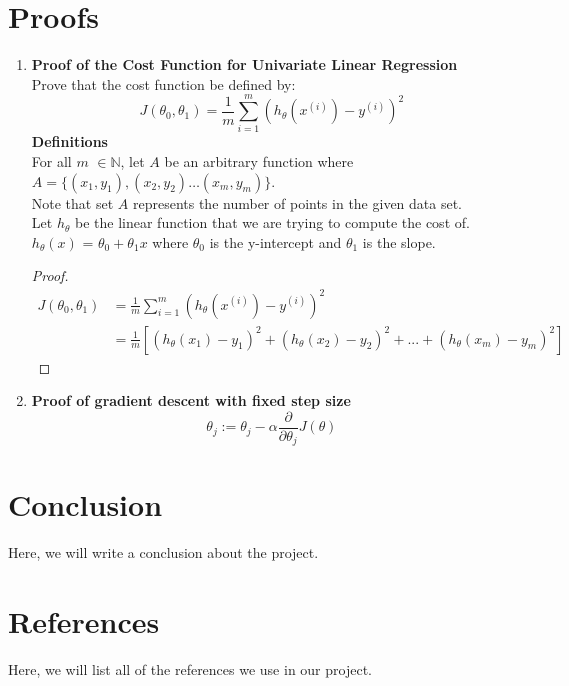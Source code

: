 \documentclass{article}
\begin{document}
\section{Proofs}
\begin{enumerate}
    \item \textbf{Proof of the Cost Function for Univariate Linear Regression}\\
    \medskip Prove that the cost function be defined by: \[
    J(\theta_0,\theta_1) = \frac{1}{m} \sum_{i = 1}^{m}(h_{\theta}(x^{(i)})-y^{(i)})^{2}
    \]
    \textbf{Definitions}\\
    For all $m$ $\in \mathbb{N}$, let $A$ be an arbitrary function where \smallskip $A = \{ (x_1, y_1), (x_2, y_2) \dots (x_m, y_m) \}$.\\
    \smallskip Note that set $A$ represents the number of points in the given data set.\\
    \smallskip Let $h_{\theta}$ be the linear function that we are trying to compute the cost of.\\
    \smallskip $h_{\theta}(x)$ = $\theta_0 + \theta_1x$ where $\theta_0$ is the y-intercept and $\theta_1$ is the slope.

    
     \begin{proof}
     \begin{align*}
          J(\theta_0,\theta_1)&=\frac{1}{m} \sum_{i = 1}^{m}(h_{\theta}(x^{(i)})-y^{(i)})^{2}\\
          &=\frac{1}{m}[(h_\theta (x_1)-y_1)^2+(h_\theta (x_2)-y_2)^2+...+(h_\theta (x_m)-y_m)^2]
     \end{align*}
     \end{proof}
    \item \textbf{Proof of gradient descent with fixed step size}
    \[
    \theta_{j} := \theta_{j} - \alpha \frac{\partial}{\partial \theta_{j}}   J(\theta)
    \]
\end{enumerate}
\section{Conclusion}
Here, we will write a conclusion about the project.
\section{References}
Here, we will list all of the references we use in our project.
\end{document}
